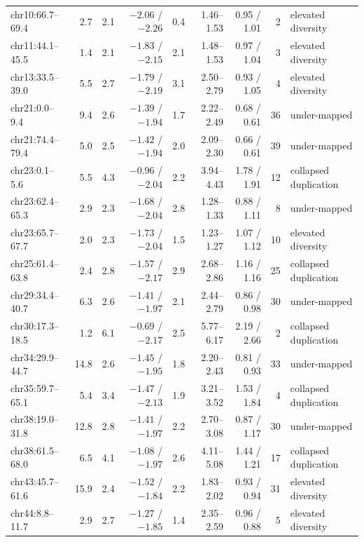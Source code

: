 \begin{table}[h]
{\begin{tabular}{lrrrrrrrl}
chr10:66.7--69.4 & 2.7 & 2.1 & $-2.06$ / $-2.26$ & 0.4 & 1.46--1.53 & 0.95 / 1.01 & 2 & elevated diversity \\
chr11:44.1--45.5 & 1.4 & 2.1 & $-1.83$ / $-2.15$ & 2.1 & 1.48--1.53 & 0.97 / 1.04 & 3 & elevated diversity \\
chr13:33.5--39.0 & 5.5 & 2.7 & $-1.79$ / $-2.19$ & 3.1 & 2.50--2.79 & 0.93 / 1.05 & 4 & elevated diversity \\
chr21:0.0--9.4 & 9.4 & 2.6 & $-1.39$ / $-1.94$ & 1.7 & 2.22--2.49 & 0.68 / 0.61 & 36 & under-mapped \\
chr21:74.4--79.4 & 5.0 & 2.5 & $-1.42$ / $-1.94$ & 2.0 & 2.09--2.30 & 0.66 / 0.61 & 39 & under-mapped \\
chr23:0.1--5.6 & 5.5 & 4.3 & $-0.96$ / $-2.04$ & 2.2 & 3.94--4.43 & 1.78 / 1.91 & 12 & collapsed duplication \\
chr23:62.4--65.3 & 2.9 & 2.3 & $-1.68$ / $-2.04$ & 2.8 & 1.28--1.33 & 0.88 / 1.11 & 8 & under-mapped \\
chr23:65.7--67.7 & 2.0 & 2.3 & $-1.73$ / $-2.04$ & 1.5 & 1.23--1.27 & 1.07 / 1.12 & 10 & elevated diversity \\
chr25:61.4--63.8 & 2.4 & 2.8 & $-1.57$ / $-2.17$ & 2.9 & 2.68--2.86 & 1.16 / 1.16 & 25 & collapsed duplication \\
chr29:34.4--40.7 & 6.3 & 2.6 & $-1.41$ / $-1.97$ & 2.1 & 2.44--2.79 & 0.86 / 0.98 & 30 & under-mapped \\
chr30:17.3--18.5 & 1.2 & 6.1 & $-0.69$ / $-2.17$ & 2.5 & 5.77--6.17 & 2.19 / 2.66 & 2 & collapsed duplication \\
chr34:29.9--44.7 & 14.8 & 2.6 & $-1.45$ / $-1.95$ & 1.8 & 2.20--2.43 & 0.81 / 0.93 & 33 & under-mapped \\
chr35:59.7--65.1 & 5.4 & 3.4 & $-1.47$ / $-2.13$ & 1.9 & 3.21--3.52 & 1.53 / 1.84 & 4 & collapsed duplication \\
chr38:19.0--31.8 & 12.8 & 2.8 & $-1.41$ / $-1.97$ & 2.2 & 2.70--3.08 & 0.87 / 1.17 & 30 & under-mapped \\
chr38:61.5--68.0 & 6.5 & 4.1 & $-1.08$ / $-1.97$ & 2.6 & 4.11--5.08 & 1.44 / 1.21 & 17 & collapsed duplication \\
chr43:45.7--61.6 & 15.9 & 2.4 & $-1.52$ / $-1.84$ & 2.2 & 1.83--2.02 & 0.93 / 0.94 & 31 & elevated diversity \\
chr44:8.8--11.7 & 2.9 & 2.7 & $-1.27$ / $-1.85$ & 1.4 & 2.35--2.59 & 0.96 / 0.88 & 5 & elevated diversity \\
\bottomrule
\end{tabular}}
\end{table}
